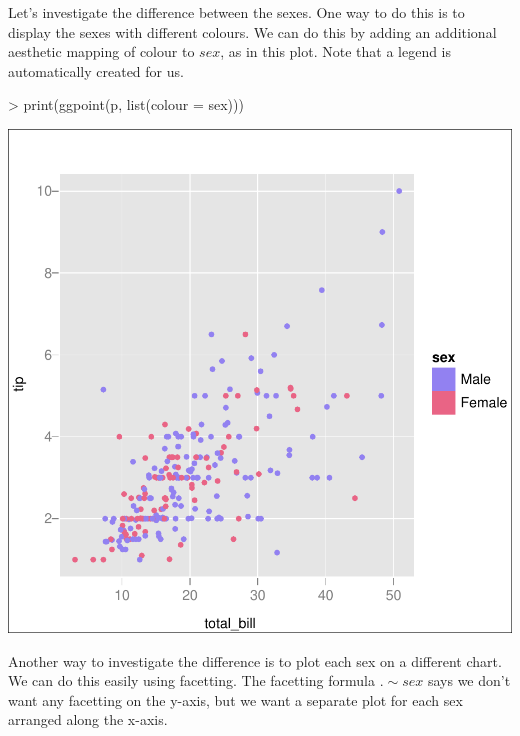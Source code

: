 \documentclass[]{article}
\begin{document}
Let's investigate the difference between the sexes.  One way to do this is to display the sexes with different colours.  We can do this by adding an additional aesthetic mapping of colour to $sex$, as in this plot.  Note that a legend is automatically created for us.

\begin{Schunk}
\begin{Sinput}
> print(ggpoint(p, list(colour = sex)))
\end{Sinput}
\end{Schunk}
\includegraphics{introduction-004}

Another way to investigate the difference is to plot each sex on a different chart.  We can do this easily using facetting.  The facetting formula $. \sim sex$ says we don't want any facetting on the y-axis, but we want a separate plot for each sex arranged along the x-axis.
\end{document}
